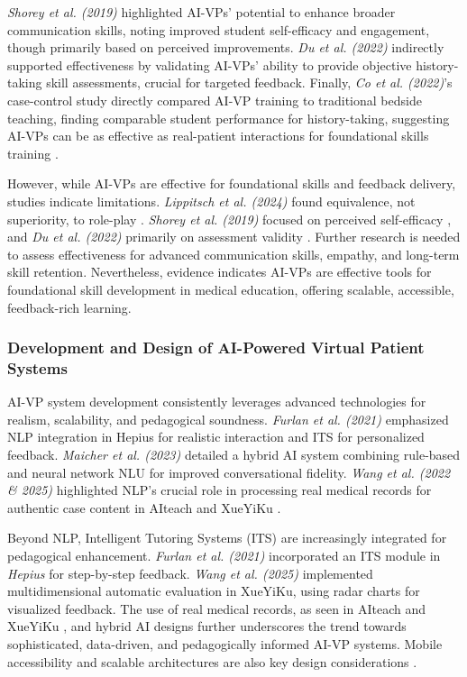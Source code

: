 \textit{Shorey et al. (2019)} highlighted AI-VPs' potential to enhance broader communication skills, noting improved student self-efficacy and engagement, though primarily based on perceived improvements. \textit{Du et al. (2022)} indirectly supported effectiveness by validating AI-VPs' ability to provide objective history-taking skill assessments, crucial for targeted feedback. Finally, \textit{Co et al. (2022)}'s case-control study directly compared AI-VP training to traditional bedside teaching, finding comparable student performance for history-taking, suggesting AI-VPs can be as effective as real-patient interactions for foundational skills training \cite{shorey_virtual_2019, jingrong_du_history-taking_2022, co_using_2022}.

However, while AI-VPs are effective for foundational skills and feedback delivery, studies indicate limitations. \textit{Lippitsch et al. (2024)} found equivalence, not superiority, to role-play \cite{lippitsch_development_2024}. \textit{Shorey et al. (2019)} focused on perceived self-efficacy \cite{shorey_virtual_2019}, and \textit{Du et al. (2022)} primarily on assessment validity \cite{jingrong_du_history-taking_2022}. Further research is needed to assess effectiveness for advanced communication skills, empathy, and long-term skill retention.  Nevertheless, evidence indicates AI-VPs are effective tools for foundational skill development in medical education, offering scalable, accessible, feedback-rich learning.

\subsubsection*{\textbf{Development and Design of AI-Powered Virtual Patient Systems}}

AI-VP system development consistently leverages advanced technologies for realism, scalability, and pedagogical soundness. \textit{Furlan et al. (2021)} emphasized NLP integration in Hepius for realistic interaction and ITS for personalized feedback. \textit{Maicher et al. (2023)} detailed a hybrid AI system combining rule-based and neural network NLU for improved conversational fidelity. \textit{Wang et al. (2022 \& 2025)} highlighted NLP's crucial role in processing real medical records for authentic case content in AIteach and XueYiKu \cite{furlan_natural_2021, maicher_artificial_2023, wang_artificial_2025, wang_intelligent_2022}.

Beyond NLP, Intelligent Tutoring Systems (ITS) are increasingly integrated for pedagogical enhancement. \textit{Furlan et al. (2021)} incorporated an ITS module in \textit{Hepius} for step-by-step feedback. \textit{Wang et al. (2025)} implemented multidimensional automatic evaluation in XueYiKu, using radar charts for visualized feedback.  The use of real medical records, as seen in AIteach and XueYiKu \cite{wang_intelligent_2022, wang_artificial_2025}, and hybrid AI designs \cite{maicher_artificial_2023} further underscores the trend towards sophisticated, data-driven, and pedagogically informed AI-VP systems. Mobile accessibility and scalable architectures are also key design considerations \cite{s_afzal_ai_2020, wang_artificial_2025}.


